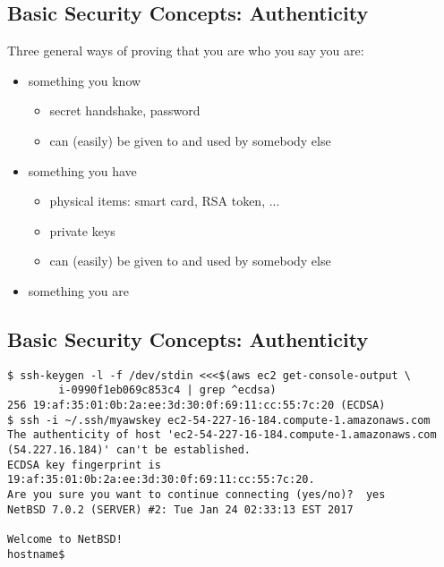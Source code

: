 \documentclass[xga]{xdvislides}
\begin{document}
\subsection{Basic Security Concepts: Authenticity}
Three general ways of proving that you are who you say you are:
\begin{itemize}
	\item something you know
		\begin{itemize}
			\item secret handshake, password
			\item can (easily) be given to and used by somebody else
		\end{itemize}
	\item something you have
		\begin{itemize}
			\item physical items: smart card, RSA token, ...
			\item private keys
			\item can (easily) be given to and used by somebody else
		\end{itemize}
	\item something you are
\end{itemize}

\subsection{Basic Security Concepts: Authenticity}
\begin{verbatim}
$ ssh-keygen -l -f /dev/stdin <<<$(aws ec2 get-console-output \
        i-0990f1eb069c853c4 | grep ^ecdsa)
256 19:af:35:01:0b:2a:ee:3d:30:0f:69:11:cc:55:7c:20 (ECDSA)
$ ssh -i ~/.ssh/myawskey ec2-54-227-16-184.compute-1.amazonaws.com
The authenticity of host 'ec2-54-227-16-184.compute-1.amazonaws.com
(54.227.16.184)' can't be established.
ECDSA key fingerprint is 19:af:35:01:0b:2a:ee:3d:30:0f:69:11:cc:55:7c:20.
Are you sure you want to continue connecting (yes/no)?  yes
NetBSD 7.0.2 (SERVER) #2: Tue Jan 24 02:33:13 EST 2017

Welcome to NetBSD!
hostname$ 
\end{verbatim}
\end{document}
